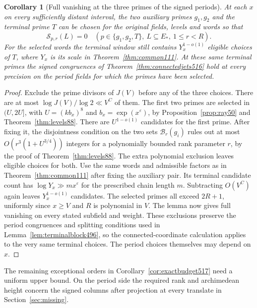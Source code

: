 \documentclass[a4paper,11pt]{article}
\newtheorem{corollary}[proposition]{Corollary}
\theoremstyle{definition}
\theoremstyle{remark}
\numberwithin{equation}{section}
\begin{document}
\begin{corollary}[Full vanishing at the three primes of the signed periods]
\leavevmode\label{cor:sameprimes517}
At each \(x\) on every sufficiently distant interval, the two
auxiliary primes \(g_1,g_2\) and the terminal prime \(T\) can be
chosen for the original fields, levels and words so that
\[
     \mathcal S_{p,r}(L)=0\quad
       (p\in\{g_1,g_2,T\},\ L\subseteq E_*,\ 1\le r<R).
\]
For the selected words the terminal window still contains
\(Y_x^{1-o(1)}\) eligible choices of \(T\), where \(Y_x\) is its
scale in Theorem~\ref{thm:common111}. At these same terminal
primes the signed congruences of Theorem~\ref{thm:connectedjets516}
hold at every precision on the period fields for which the
primes have been selected.
\end{corollary}
\begin{proof}
Exclude the prime divisors of \(J(V)\) before any of the three
choices. There are at most \(\log J(V)/\log2\ll V^C\) of them.
The first two primes are selected in \((U,2U]\), with
\(U=(k b_x)^8\) and \(b_x=\exp(x^\varepsilon)\), by
Proposition~\ref{prop:ray50} and Theorem~\ref{thm:levels88}.
There are \(U^{1-o(1)}\) candidates for the first prime. After
fixing it, the disjointness condition on the two sets
\(\mathcal B_r(g_i)\) rules out at most
\(O(r^3(1+U^{3/4}))\) integers for a polynomially bounded
rank parameter \(r\), by the proof of Theorem~\ref{thm:levels88}.
The extra polynomial exclusion leaves eligible choices for both.
Use the same words and admissible factors as in
Theorem~\ref{thm:common111} after fixing the auxiliary pair.
Its terminal candidate count has
\(\log Y_x\gg m x^\varepsilon\) for the prescribed chain length
\(m\). Subtracting \(O(V^C)\) again leaves \(Y_x^{1-o(1)}\)
candidates. The selected primes all exceed \(2R+1\), uniformly
since \(x\ge V\) and \(R\) is polynomial in \(V\).
The lemma now gives full vanishing on every stated subfield
and weight. These exclusions preserve the period congruences
and splitting conditions used in Lemma~\ref{lem:terminalblock496},
so the connected-coordinate calculation applies to the very
same terminal choices. The period choices themselves may
depend on \(x\).
\end{proof}

The remaining exceptional orders in Corollary~\ref{cor:exactbudget517}
need a uniform upper bound. On the period side the required rank
and archimedean height concern the signed columns after projection
at every translate in Section~\ref{sec:missing}.
\end{document}
